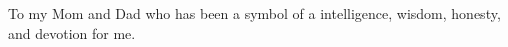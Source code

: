 \vspace*{7cm}
\begin{center}
To my Mom and Dad who has been a symbol of a intelligence, wisdom, honesty, and devotion for me.  
\end{center}
